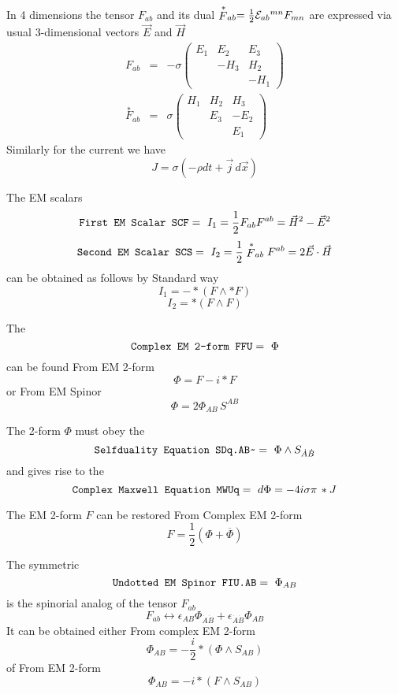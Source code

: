 \documentclass[twoside,openright]{report}
\newcommand{\grgtt}{\ttfamily}
\newcommand{\object}[2]{%
\begin{equation}
\mbox{\comm{#1}} =\ #2
\end{equation}}
\newcommand{\tsst}{\longleftrightarrow}
\renewcommand{\tt}{\grgtt}
\newcommand{\cc}{{\tt \char'176}}           %
\newcommand{\comm}[1]{{\upshape\tt#1}}    %
\begin{document}
In 4 dimensions the tensor $F_{ab}$ and its dual
$\stackrel{*}{F}_{ab}=\frac{1}{2}{\cal E}_{ab}{}^{mn}F_{mn}$
are expressed via usual 3-dimensional vectors $\vec E$ and
$\vec H$
\begin{eqnarray}
F_{ab}&=&-\sigma\left(\begin{array}{rrr}
E_1&E_2&E_3\\
&-H_3&H_2\\
&&-H_1\end{array}\right)\\[1.5mm]
\stackrel{*}{F}_{ab}&=&\sigma\left(\begin{array}{rrr}
H_1&H_2&H_3\\
&E_3&-E_2\\
&&E_1\end{array}\right)
\end{eqnarray}
Similarly for the current we have
\begin{equation}
J=\sigma(-\rho dt + \vec j\,d\vec x)
\end{equation}

The {\tt EM scalars}
\object{First EM Scalar   SCF}{I_1=\frac12F_{ab}F^{ab}
={\vec H}^2-{\vec E}^2}
\object{Second EM Scalar SCS}{I_2=\frac12\stackrel{*}{F}_{ab}F^{ab}
=2\vec E\cdot\vec H}
can be obtained as follows by {\tt Standard way}
\begin{equation}
I_1 = -*(F\wedge*F)
\end{equation}
\begin{equation}
I_2 = *(F\wedge F)
\end{equation}

The
\object{Complex EM 2-form FFU}{\Phi}
can be found {\tt From EM 2-form}
\begin{equation}
\Phi=F-i*F
\end{equation}
or {\tt From EM Spinor}
\begin{equation}
\Phi = 2\Phi_{AB}\,S^{AB}
\end{equation}

The 2-form $\Phi$ must obey the
\object{Selfduality Equation  SDq.AB\cc}{\Phi\wedge S_{\dot A\dot B}}
and gives rise to the
\object{Complex Maxwell Equation MWUq}{d\Phi=-4i\sigma\pi\,*J}

The EM 2-form $F$ can be restored {\tt From Complex EM 2-form}
\begin{equation}
F=\frac{1}{2}(\Phi+\overline\Phi)
\end{equation}

The symmetric
\object{Undotted EM Spinor FIU.AB}{\Phi_{AB}}
is the spinorial analog of the tensor $F_{ab}$
\begin{equation}
 F_{ab} \tsst \epsilon_{AB} \Phi_{\dot A\dot B}
+ \epsilon_{\dot A\dot B} \Phi_{AB}
\end{equation}
It can be obtained either {\tt From complex EM 2-form}
\begin{equation}
\Phi_{AB} = -\frac{i}{2}*(\Phi\wedge S_{AB})
\end{equation}
of {\tt From EM 2-form}
\begin{equation}
\Phi_{AB} = -i*(F\wedge S_{AB})
\end{equation}
\end{document}
